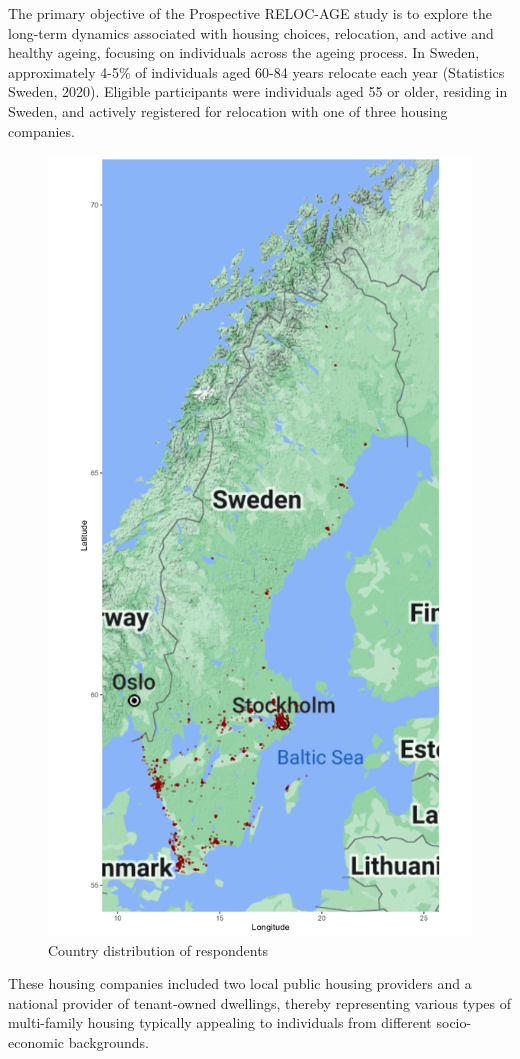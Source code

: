 \documentclass[3p,11pt ]{elsarticle}
\begin{document}
The primary objective of the Prospective RELOC-AGE study is to explore the long-term dynamics associated with housing choices, relocation, and active and healthy ageing, focusing on individuals across the ageing process.
In Sweden, approximately 4-5\% of individuals aged 60-84 years relocate each year (Statistics Sweden, 2020).
Eligible participants were individuals aged 55 or older, residing in Sweden, and actively registered for relocation with one of three housing companies.
\begin{figure}
\centering
\includegraphics[scale=0.25]{figures/survey_location.png}
\caption{Country distribution of respondents \label{fig:map}}
\end{figure}
These housing companies included two local public housing providers and a national provider of tenant-owned dwellings, thereby representing various types of multi-family housing typically appealing to individuals from different socio-economic backgrounds. 
\end{document}
